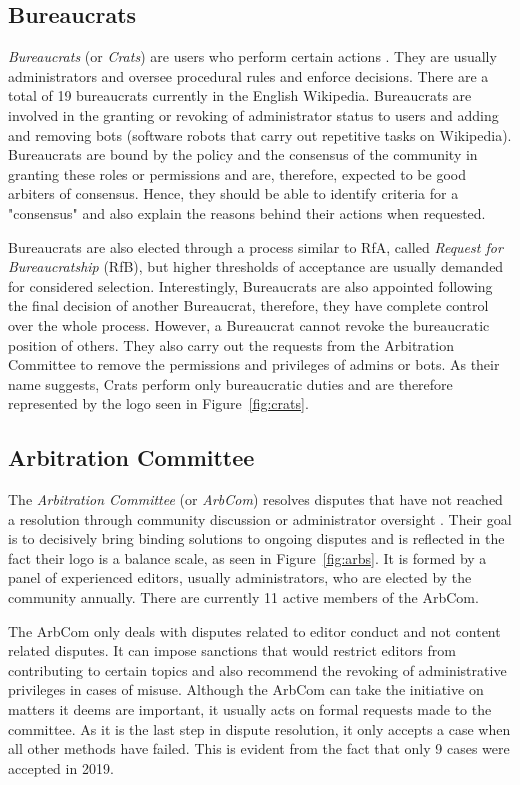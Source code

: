 \subsection{Bureaucrats}
\textit{Bureaucrats} (or \textit{Crats}) are users who perform certain actions \cite{wiki:bureaucrats}. They are usually administrators and oversee procedural rules and enforce decisions. There are a total of 19 bureaucrats currently in the English Wikipedia. Bureaucrats are involved in the granting or revoking of administrator status to users and adding and removing bots (software robots that carry out repetitive tasks on Wikipedia). Bureaucrats are bound by the policy and the consensus of the community in granting these roles or permissions and are, therefore, expected to be good arbiters of consensus. Hence, they should be able to identify criteria for a "consensus" and also explain the reasons behind their actions when requested. 

Bureaucrats are also elected through a process similar to RfA, called \textit{Request for Bureaucratship} (RfB), but higher thresholds of acceptance are usually demanded for considered selection. Interestingly, Bureaucrats are also appointed following the final decision of another Bureaucrat, therefore, they have complete control over the whole process. However, a Bureaucrat cannot revoke the bureaucratic position of others. They also carry out the requests from the Arbitration Committee to remove the permissions and privileges of admins or bots. As their name suggests, Crats perform only bureaucratic duties and are therefore represented by the logo seen in Figure~\ref{fig:crats}.

\subsection{Arbitration Committee}
The \textit{Arbitration Committee} (or \textit{ArbCom}) resolves disputes that have not reached a resolution through community discussion or administrator oversight \cite{wiki:arbcom}. Their goal is to decisively bring binding solutions to ongoing disputes and is reflected in the fact their logo is a balance scale, as seen in Figure~\ref{fig:arbs}. It is formed by a panel of experienced editors, usually administrators, who are elected by the community annually. There are currently 11 active members of the ArbCom.

The ArbCom only deals with disputes related to editor conduct and not content related disputes. It can impose sanctions that would restrict editors from contributing to certain topics and also recommend the revoking of administrative privileges in cases of misuse. Although the ArbCom can take the initiative on matters it deems are important, it usually acts on formal requests made to the committee. As it is the last step in dispute resolution, it only accepts a case when all other methods have failed. This is evident from the fact that only 9 cases were accepted in 2019. 

